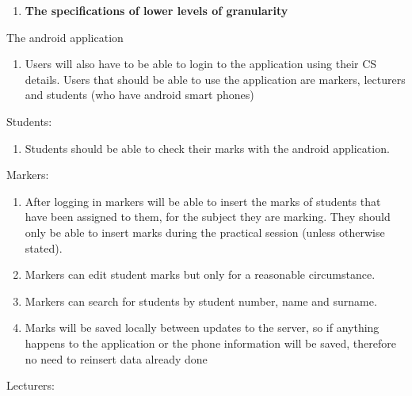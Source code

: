 \documentclass{article}
\begin{document}
\noindent 

\begin{enumerate}
\item  \textbf{The specifications of lower levels of granularity}
\end{enumerate}

 

\noindent The android application

\begin{enumerate}
\item  Users will also have to be able to login to the application using their CS details. Users that should be able to use the application are markers, lecturers and students (who have android smart phones) 
\end{enumerate}

\noindent 

\noindent Students: 

\begin{enumerate}
\item  Students should be able to check their marks with the android application. 
\end{enumerate}

\noindent 

\noindent Markers: 

\begin{enumerate}
\item  After logging in markers will be able to insert the marks of students that have been assigned to them, for the subject they are marking. They should only be able to insert marks during the practical session (unless otherwise stated). 

\item  Markers can edit student marks but only for a reasonable circumstance. 

\item  Markers can search for students by student number, name and surname.

\item  Marks will be saved locally between updates to the server, so if anything happens to the application or the phone information will be saved, therefore no need to reinsert data already done
\end{enumerate}

\noindent 

\noindent Lecturers: 
\end{document}
